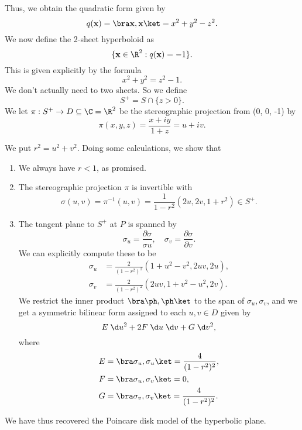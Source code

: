 \documentclass[a4paper]{article}
\begin{document}
Thus, we obtain the quadratic form given by
\[
  q(\mathbf{x}) = \bra \mathbf{x}, \mathbf{x}\ket = x^2 + y^2 - z^2.
\]
We now define the 2-sheet hyperboloid as
\[
  \{\mathbf{x} \in \R^2: q(\mathbf{x}) = -1\}.
\]
This is given explicitly by the formula
\[
  x^2 + y^2 = z^2 - 1.
\]
We don't actually need to two sheets. So we define
\[
  S^+ = S \cap \{z > 0\}.
\]
We let $\pi: S^+ \to D \subseteq \C = \R^2$ be the stereographic projection from (0, 0, -1) by
\[
  \pi(x, y, z) = \frac{x + iy}{1 + z} = u + iv.
\]
\begin{center}
\end{center}
We put $r^2 = u^2 + v^2$. Doing some calculations, we show that
\begin{enumerate}
  \item We always have $r < 1$, as promised.
  \item The stereographic projection $\pi$ is invertible with
    \[
      \sigma(u, v) = \pi^{-1}(u, v) = \frac{1}{1 - r^2}(2u, 2v, 1 + r^2) \in S^+.
    \]
  \item The tangent plane to $S^+$ at $P$ is spanned by
    \[
      \sigma_u = \frac{\partial \sigma}{\sigma u},\quad \sigma_v = \frac{\partial \sigma}{\partial v}.
    \]
    We can explicitly compute these to be
    \begin{align*}
      \sigma_u &= \frac{2}{(1 - r^2)^2} (1 + u^2 - v^2, 2uv, 2u),\\
      \sigma_v &= \frac{2}{(1 - r^2)^2} (2uv, 1 + v^2 - u^2, 2v).
    \end{align*}
    We restrict the inner product $\bra \ph, \ph \ket$ to the span of $\sigma_u, \sigma_v$, and we get a symmetric bilinear form assigned to each $u, v \in D$ given by
    \[
      E\;\d u^2 + 2F \;\d u\;\d v + G \;\d v^2,
    \]
    where
    \begin{align*}
      E &= \bra \sigma_u, \sigma_u\ket = \frac{4}{(1 - r^2)^2},\\
      F &= \bra \sigma_u, \sigma_v\ket = 0,\\
      G &= \bra \sigma_v, \sigma_v\ket = \frac{4}{(1 - r^2)^2}.
    \end{align*}
\end{enumerate}
We have thus recovered the Poincare disk model of the hyperbolic plane.
\end{document}
